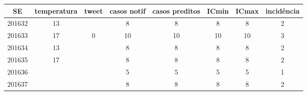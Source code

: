\begin{tabular}{c|ccccccc}
  \hline
SE & temperatura & tweet & casos notif & casos preditos & ICmin & ICmax & incidência \\ 
  \hline
201632 & 13 &  & 8 & 8 & 8 & 8 & 2 \\ 
  201633 & 17 & 0 & 10 & 10 & 10 & 10 & 3 \\ 
  201634 & 13 &  & 8 & 8 & 8 & 8 & 2 \\ 
  201635 & 17 &  & 8 & 8 & 8 & 8 & 2 \\ 
  201636 &  &  & 5 & 5 & 5 & 5 & 1 \\ 
  201637 &  &  & 8 & 8 & 8 & 8 & 2 \\ 
   \hline
\end{tabular}
